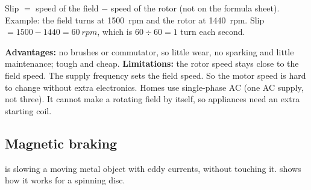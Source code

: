 Slip $=$ speed of the field $-$ speed of the rotor (not on the formula sheet). Example:
the field turns at \qty{1500}{rpm} and the rotor at \qty{1440}{rpm}. Slip
$= 1500 - 1440 = \qty{60}{rpm}$, which is $60 \div 60 = 1$ turn each second.

\textbf{Advantages:} no brushes or commutator, so little wear, no sparking and little
maintenance; tough and cheap. \textbf{Limitations:} the rotor speed stays close to the
field speed. The supply frequency sets the field speed. So the motor speed is hard to
change without extra electronics. Homes use single-phase AC (one AC supply, not three).
It cannot make a rotating field by itself, so appliances need an extra starting coil.

\subsection{Magnetic braking}
 is slowing a moving metal object with eddy currents, without
touching it.  shows how it works for a spinning disc.

